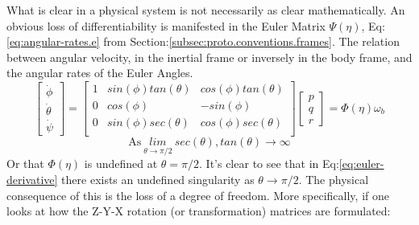 \par
What is clear in a physical system is not necessarily as clear mathematically. An obvious loss of differentiability is manifested in the Euler Matrix $\Psi(\eta)$, Eq:\ref{eq:angular-rates.e} from Section:\ref{subsec:proto.conventions.frames}. The relation between angular velocity, in the inertial frame or inversely in the body frame, and the angular rates of the Euler Angles.
\begin{equation}\label{eq:euler-derivative}
\begin{bmatrix}
\dot{\phi}\\
\dot{\theta}\\
\dot{\psi}
\end{bmatrix}
=\begin{bmatrix}
1 & sin(\phi)tan(\theta) & cos(\phi)tan(\theta)\\
0 & cos(\phi) & -sin(\phi)\\
0 & sin(\phi)sec(\theta) & cos(\phi)sec(\theta)\\
\end{bmatrix}
\begin{bmatrix}
p\\
q\\
r
\end{bmatrix}
=\Phi(\eta)\omega_b
\end{equation}
\begin{equation}
\text{As}~\underset{{\theta \rightarrow \pi /2}}{lim}~sec(\theta),tan(\theta)\rightarrow \infty
\end{equation}
Or that $\Phi(\eta)$ is undefined at $\theta=\pi/2$. 
It's clear to see that in Eq:\ref{eq:euler-derivative} there exists an undefined singularity as $\theta\rightarrow\pi/2$. The physical consequence of this is the loss of a degree of freedom. More specifically, if one looks at how the Z-Y-X rotation (or transformation) matrices are formulated:
